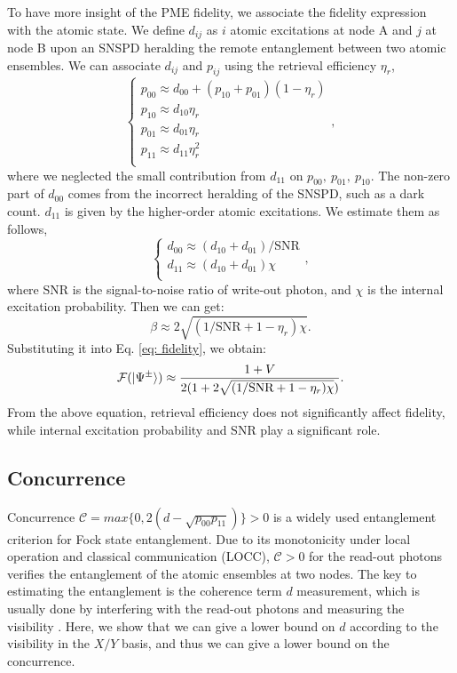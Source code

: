 \documentclass[aps,reprint,showpacs,superscriptaddress]{revtex4-2}
\begin{document}
To have more insight of the PME fidelity, we associate the fidelity expression with the atomic state. We define $d_{ij}$ as $i$ atomic excitations at node A and $j$ at node B upon an SNSPD heralding the remote entanglement between two atomic ensembles. We can associate $d_{ij}$ and $p_{ij}$ using the retrieval efficiency $\eta_r$,
\begin{equation}
	\begin{cases}
		p_{00}\approx d_{00}+(p_{10}+p_{01})(1-\eta_r)\\
		p_{10}\approx d_{10}\eta_r\\
		p_{01}\approx d_{01}\eta_r\\
		p_{11}\approx d_{11}\eta_r^2\\
	\end{cases},
\end{equation}
where we neglected the small contribution from $d_{11}$ on $p_{00},\ p_{01},\ p_{10}$. The non-zero part of $d_{00}$ comes from the incorrect heralding of the SNSPD, such as a dark count. $d_{11}$ is given by the higher-order atomic excitations. We estimate them as follows,
\begin{equation}
	\begin{cases}
		d_{00}\approx (d_{10}+d_{01})/\textrm{SNR}\\
		d_{11}\approx (d_{10}+d_{01})\chi\\
	\end{cases},
\end{equation}
where $\textrm{SNR}$ is the signal-to-noise ratio of write-out photon, and $\chi$ is the internal excitation probability. Then we can get:
\begin{equation}
	\beta\approx 2\sqrt{(1/\textrm{SNR}+1-\eta_r)\chi}.
	\label{eq: beta}
\end{equation}
Substituting it into Eq. \ref{eq: fidelity}, we obtain:
\begin{equation}
	\mathcal{F}(\ket{\Psi^\pm})\approx\frac{1+V}{2(1+2\sqrt{(1/\textrm{SNR}+1-\eta_r)\chi})}.
\end{equation}
From the above equation, retrieval efficiency does not significantly affect fidelity, while internal excitation probability and SNR play a significant role.

\subsection{Concurrence}
Concurrence $\mathcal{C}=max\{0,2(d-\sqrt{p_{00}p_{11}})\}>0$ is a widely used entanglement criterion for Fock state entanglement. Due to its monotonicity under local operation and classical communication (LOCC), $\mathcal{C}>0$ for the read-out photons verifies the entanglement of the atomic ensembles at two nodes. The key to estimating the entanglement is the coherence term $d$ measurement, which is usually done by interfering with the read-out photons and measuring the visibility \cite{chou2005sm, yu2020asm, lago-rivera2021sm}. Here, we show that we can give a lower bound on $d$ according to the visibility in the $X/Y$ basis, and thus we can give a lower bound on the concurrence.
\end{document}
